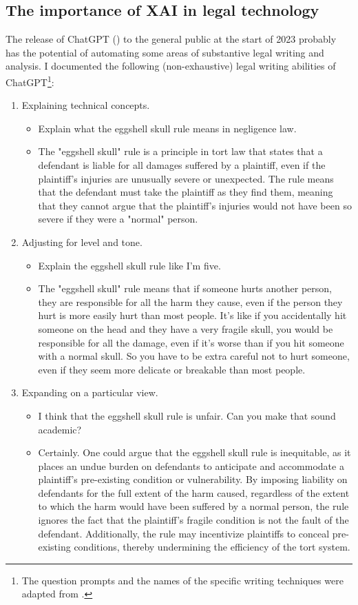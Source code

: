\subsection{The importance of XAI in legal technology}
The release of ChatGPT (\cite{openai}) to the general public at the start of 2023 probably has the potential of automating some areas of substantive legal writing and analysis. I documented the following (non-exhaustive) legal writing abilities of ChatGPT\footnote{The question prompts and the names of the specific writing techniques were adapted from \cite{bishop2023computer}.}: 
\begin{enumerate}
  \item Explaining technical concepts. 
  \begin{itemize}
    \item[Q:] Explain what the eggshell skull rule means in negligence law. 
    \item[A:] The "eggshell skull" rule is a principle in tort law that states that a defendant is liable for all damages suffered by a plaintiff, even if the plaintiff's injuries are unusually severe or unexpected. The rule means that the defendant must take the plaintiff as they find them, meaning that they cannot argue that the plaintiff's injuries would not have been so severe if they were a "normal" person.
  \end{itemize}
  \item Adjusting for level and tone. 
  \begin{itemize}
    \item[Q:] Explain the eggshell skull rule like I'm five.
    \item[A:] The "eggshell skull" rule means that if someone hurts another person, they are responsible for all the harm they cause, even if the person they hurt is more easily hurt than most people. It's like if you accidentally hit someone on the head and they have a very fragile skull, you would be responsible for all the damage, even if it's worse than if you hit someone with a normal skull. So you have to be extra careful not to hurt someone, even if they seem more delicate or breakable than most people.
  \end{itemize}
  \item Expanding on a particular view. 
  \begin{itemize}
    \item[Q:] I think that the eggshell skull rule is unfair. Can you make that sound academic?
    \item[A:] Certainly. One could argue that the eggshell skull rule is inequitable, as it places an undue burden on defendants to anticipate and accommodate a plaintiff's pre-existing condition or vulnerability. By imposing liability on defendants for the full extent of the harm caused, regardless of the extent to which the harm would have been suffered by a normal person, the rule ignores the fact that the plaintiff's fragile condition is not the fault of the defendant. Additionally, the rule may incentivize plaintiffs to conceal pre-existing conditions, thereby undermining the efficiency of the tort system.

\end{itemize}
\end{enumerate}
